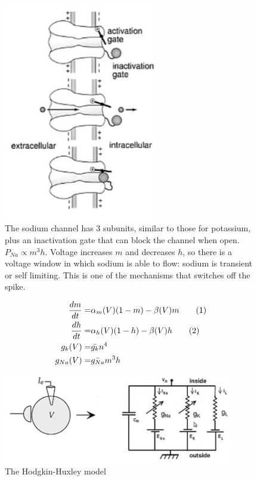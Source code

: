 \documentclass[]{article}
\newcommand\numberthis{\addtocounter{equation}{1}\tag{\theequation}}
\begin{document}
\begin{figure}[H]
	\begin{center}
		\caption[The sodium channel]{The sodium channel has 3 subunits, similar to those for potassium, plus an inactivation gate that can block the channel when open. $P_{Na}\propto m^3 h$. Voltage increases $m$ and decreases $h$, so there is a voltage window in which sodium is able to flow: sodium is transient or self limiting. This is one of the mechanisms that switches off the spike.}
	\includegraphics[width=0.6\textwidth]{na-channel}
	\end{center}
\end{figure}

\begin{align*}
	\frac{dm}{dt} =& \alpha_m(V)(1-m) - \beta(V)m \numberthis \label{eq:m}\\
	\frac{dh}{dt} =& \alpha_h(V)(1-h) - \beta(V)h\numberthis \label{eq:h} \\
	g_k(V) =& \bar{g_k} n^4\\
	g_{Na}(V)=& \bar{g_{Na}}m^3h
\end{align*}

\begin{figure}[H]
	\caption{The Hodgkin-Huxley model}\label{fig:hodgkin-huxley}
	\includegraphics[width=0.9\textwidth]{hodgkin-huxley}
\end{figure}
\end{document}
